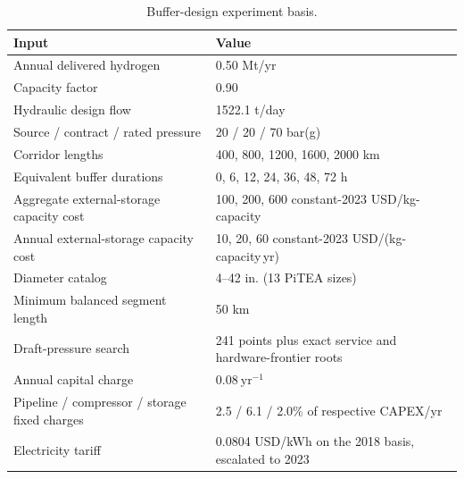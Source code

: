 \begin{table}[!t]
\centering
\caption{Buffer-design experiment basis.}
\label{tab:buffer_design_inputs_si}
\small
\begin{tabularx}{\textwidth}{@{}lX@{}}
\toprule
Input & Value \\
\midrule
Annual delivered hydrogen & 0.50 Mt/yr \\
Capacity factor & 0.90 \\
Hydraulic design flow & 1522.1 t/day \\
Source / contract / rated pressure & 20 / 20 / 70 bar(g) \\
Corridor lengths & 400, 800, 1200, 1600, 2000 km \\
Equivalent buffer durations & 0, 6, 12, 24, 36, 48, 72 h \\
Aggregate external-storage capacity cost & 100, 200, 600 constant-2023 USD/kg-capacity \\
Annual external-storage capacity cost & 10, 20, 60 constant-2023 USD/(kg-capacity\,yr) \\
Diameter catalog & 4--42 in. (13 PiTEA sizes) \\
Minimum balanced segment length & 50 km \\
Draft-pressure search & 241 points plus exact service and hardware-frontier roots \\
Annual capital charge & $0.08~\mathrm{yr}^{-1}$ \\
Pipeline / compressor / storage fixed charges & 2.5 / 6.1 / 2.0\% of respective CAPEX/yr \\
Electricity tariff & 0.0804 USD/kWh on the 2018 basis, escalated to 2023 \\
\bottomrule
\end{tabularx}
\end{table}
